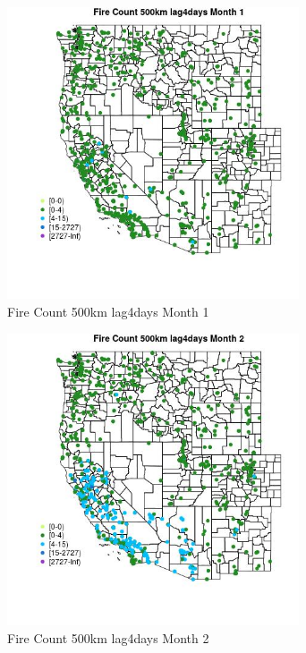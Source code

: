 \begin{figure} 
\centering  
\includegraphics[width=0.77\textwidth]{Code_Outputs/Report_ML_input_PM25_Step4_part_f_de_duplicated_aves_prioritize_24hr_obswNAs_MapObsMo1Fire_Count_500km_lag4days.jpg} 
\caption{\label{fig:Report_ML_input_PM25_Step4_part_f_de_duplicated_aves_prioritize_24hr_obswNAsMapObsMo1Fire_Count_500km_lag4days}Fire Count 500km lag4days Month 1} 
\end{figure} 
 

\begin{figure} 
\centering  
\includegraphics[width=0.77\textwidth]{Code_Outputs/Report_ML_input_PM25_Step4_part_f_de_duplicated_aves_prioritize_24hr_obswNAs_MapObsMo2Fire_Count_500km_lag4days.jpg} 
\caption{\label{fig:Report_ML_input_PM25_Step4_part_f_de_duplicated_aves_prioritize_24hr_obswNAsMapObsMo2Fire_Count_500km_lag4days}Fire Count 500km lag4days Month 2} 
\end{figure} 
 

